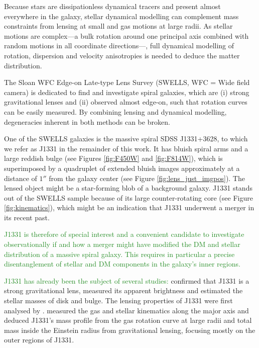 \documentclass[useAMS,usenatbib]{mnras}
\newcommand{\NEW}[1]{\textcolor{ForestGreen}{#1}}
\begin{document}
Because stars are dissipationless dynamical tracers and present almost everywhere in the galaxy, stellar dynamical modelling can complement mass constraints from lensing at small and gas motions at large radii. As stellar motions are complex---a bulk rotation around one principal axis combined with random motions in all coordinate directions---\citep{2008gady.book.....B}, full dynamical modelling of rotation, dispersion and velocity anisotropies is needed to deduce the matter distribution.

The Sloan WFC Edge-on Late-type Lens Survey (SWELLS, WFC = Wide field camera) \citep{SWELLSI,SWELLSII,SWELLSIII,SWELLSIV,SWELLSV,SWELLSVI} is dedicated to find and investigate spiral galaxies, which are (i) strong gravitational lenses and (ii) observed almost edge-on, such that rotation curves can be easily measured. By combining lensing and dynamical modelling, degeneracies inherent in both methods can be broken.

One of the SWELLS galaxies is the massive spiral SDSS J1331+3628, to which we refer as J1331 in the remainder of this work. It has bluish spiral arms and a large reddish bulge (see Figures \ref{fig:F450W} and \ref{fig:F814W}), which is superimposed by a quadruplet of extended bluish images approximately at a distance of $1''$ from the galaxy center (see Figure \ref{fig:lens_just_imgpos}). The lensed object might be a star-forming blob of a background galaxy. J1331 stands out of the SWELLS sample because of its large counter-rotating core (see Figure \ref{fig:kinematics}), which might be an indication that J1331 underwent a merger in its recent past.

\NEW{J1331 is therefore of special interest and a convenient candidate to investigate observationally if and how a merger might have modified the DM and stellar distribution of a massive spiral galaxy. This requires in particular a precise disentanglement of stellar and DM components in the galaxy's inner regions.}

\NEW{J1331 has already been the subject of several studies:} \citet{SWELLSI} confirmed that J1331 is a strong gravitational lens, measured its apparent brightness and estimated the stellar masses of disk and bulge. The lensing properties of J1331 were first analysed by \citet{SWELLSIII}. \citet{SWELLSV} measured the gas and stellar kinematics along the major axis and deduced J1331's mass profile from the gas rotation curve at large radii and total mass inside the Einstein radius from gravitational lensing, focusing mostly on the outer regions of J1331.
\end{document}
